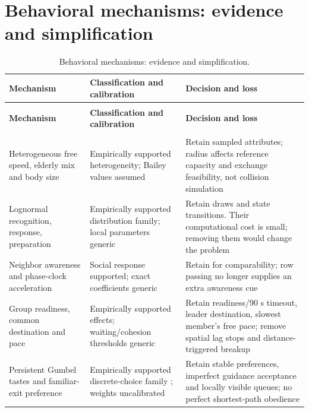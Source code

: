 \documentclass[11pt,a4paper]{article}
\begin{document}
\section{Behavioral mechanisms: evidence and simplification}

\begingroup\small
\begin{longtable}{@{}>{\raggedright\arraybackslash}p{}>{\raggedright\arraybackslash}p{}>{\raggedright\arraybackslash}p{}@{}}
\caption{Behavioral mechanisms: evidence and simplification.}\label{tab:2}\\
\toprule
\textbf{Mechanism} & \textbf{Classification and calibration} & \textbf{Decision and loss} \\
\midrule\endfirsthead
\multicolumn{3}{l}{\small\itshape Table \thetable{} continued}\\\toprule
\textbf{Mechanism} & \textbf{Classification and calibration} & \textbf{Decision and loss} \\
\midrule\endhead
\midrule\multicolumn{3}{r}{\small Continued on next page}\\\endfoot
\bottomrule\endlastfoot
Heterogeneous free speed, elderly mix and body size & Empirically supported heterogeneity; Bailey values assumed & Retain sampled attributes; radius affects reference capacity and exchange feasibility, not collision simulation \\
Lognormal recognition, response, preparation & Empirically supported distribution family; local parameters generic \cite{R5} & Retain draws and state transitions. Their computational cost is small; removing them would change the problem \\
Neighbor awareness and phase-clock acceleration & Social response supported; exact coefficients generic & Retain for comparability; row passing no longer supplies an extra awareness cue \\
Group readiness, common destination and pace & Empirically supported effects; waiting/cohesion thresholds generic \cite{R13,R14} & Retain readiness/90 s timeout, leader destination, slowest member's free pace; remove spatial lag stops and distance-triggered breakup \\
Persistent Gumbel tastes and familiar-exit preference & Empirically supported discrete-choice family \cite{R3}; weights uncalibrated & Retain stable preferences, imperfect guidance acceptance and locally visible queues; no perfect shortest-path obedience \\

\end{longtable}
\end{document}
